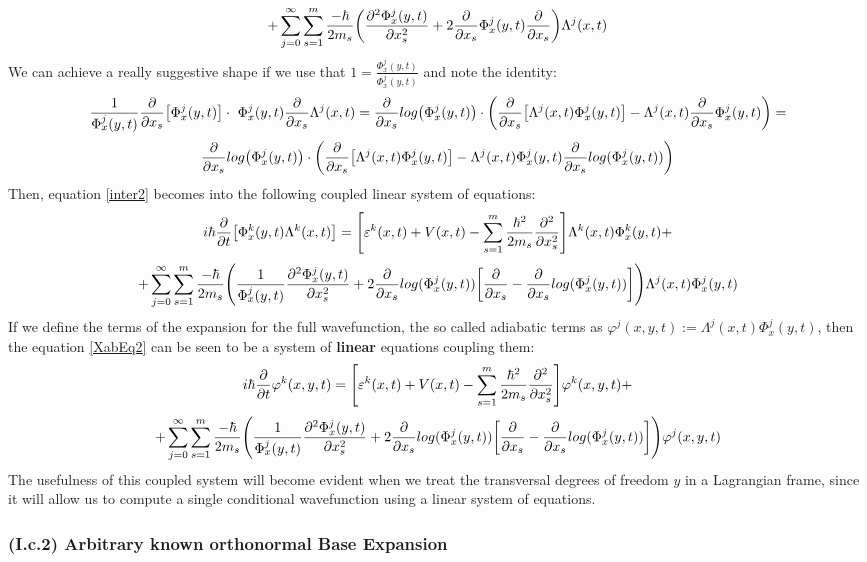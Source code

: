\documentclass[11pt, a4paper]{article} %
\begin{document}
$$
+\sum_{j=0}^\infty\sum_{s=1}^m \frac{-\hbar}{2m_s}\qty( \pdv[2]{\Phi^j_x(y,t)}{x_s}+2\pdv{}{x_s}\Phi^j_x(y,t)\pdv{}{x_s} )\Lambda^j(x,t)
$$
We can achieve a really suggestive shape if we use that $1=\frac{\Phi^j_x(y,t)}{\Phi^j_x(y,t)}$ and note the identity:
\begin{equation}
\frac{1}{\Phi^j_x(y,t)}\pdv{}{x_s}\qty[\Phi^j_x(y,t)]\cdot\ \Phi^j_x(y,t)\pdv{}{x_s}\Lambda^j(x,t)=\pdv{}{x_s}log\qty(\Phi^j_x(y,t))\cdot \qty(\pdv{}{x_s}\qty[\Lambda^j(x,t)\Phi^j_x(y,t)]-\Lambda^j(x,t)\pdv{}{x_s}\Phi^j_x(y,t) )=
\end{equation}
$$
\pdv{}{x_s}log\qty(\Phi^j_x(y,t))\cdot \qty(\pdv{}{x_s}\qty[\Lambda^j(x,t)\Phi^j_x(y,t)]-\Lambda^j(x,t)\Phi^j_x(y,t)\pdv{}{x_s}log(\Phi^j_x(y,t)) )
$$
Then, equation \eqref{inter2} becomes into the following coupled linear system of equations:
\begin{equation}\label{XabEq2}
 i\hbar\pdv{}{t}\qty[ \Phi^k_x(y,t)\Lambda^k(x,t)]=\qty[ \varepsilon^k(x,t)+V(x,t)  -\sum_{s=1}^m\frac{\hbar^2}{2m_s}\pdv[2]{}{x_s} ]\Lambda^k(x,t)\Phi^k_x(y,t)+
\end{equation}
$$
+\sum_{j=0}^\infty\sum_{s=1}^m \frac{-\hbar}{2m_s}\qty( \frac{1}{\Phi^j_x(y,t)}\pdv[2]{\Phi^j_x(y,t)}{x_s}+2\pdv{}{x_s}log(\Phi^j_x(y,t))\qty[\pdv{}{x_s}-\pdv{}{x_s}log(\Phi^j_x(y,t))] )\Lambda^j(x,t)\Phi^j_x(y,t)
$$
If we define the terms of the expansion for the full wavefunction, the so called adiabatic terms as $\varphi^j(x,y,t):=\Lambda^j(x,t)\Phi^j_x(y,t)$, then the equation \eqref{XabEq2} can be seen to be a system of {\bf linear} equations coupling them:
\begin{equation}\label{XabEq2.5}
 i\hbar\pdv{}{t}\varphi^k(x,y,t)=\qty[ \varepsilon^k(x,t)+V(x,t)  -\sum_{s=1}^m\frac{\hbar^2}{2m_s}\pdv[2]{}{x_s} ]\varphi^k(x,y,t)+
\end{equation}
$$
+\sum_{j=0}^\infty\sum_{s=1}^m \frac{-\hbar}{2m_s}\qty( \frac{1}{\Phi^j_x(y,t)}\pdv[2]{\Phi^j_x(y,t)}{x_s}+2\pdv{}{x_s}log(\Phi^j_x(y,t))\qty[\pdv{}{x_s}-\pdv{}{x_s}log(\Phi^j_x(y,t))] )\varphi^j(x,y,t)
$$
The usefulness of this coupled system will become evident when we treat the transversal degrees of freedom $y$ in a Lagrangian frame, since it will allow us to compute a single conditional wavefunction using a linear system of equations.

\subsubsection*{(I.c.2) Arbitrary known orthonormal Base Expansion}
\end{document}

